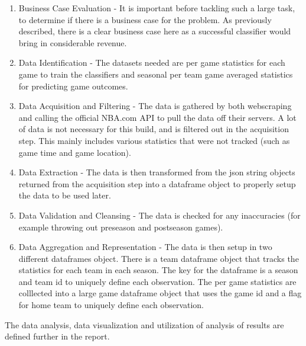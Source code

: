 \documentclass[12pt]{article}%
\begin{document}
\begin{enumerate}
\item Business Case Evaluation - It is important before tackling such a large task, to determine if there is a business case for the problem. As previously described, there is a clear business case here as a successful classifier would bring in considerable revenue.
\item Data Identification - The datasets needed are per game statistics for each game to train the classifiers and seasonal per team game averaged statistics for predicting game outcomes.
\item Data Acquisition and Filtering - The data is gathered by both webscraping and calling the official NBA.com API to pull the data off their servers. A lot of data is not necessary for this build, and is filtered out in the acquisition step. This mainly includes various statistics that were not tracked (such as game time and game location).
\item Data Extraction - The data is then transformed from the json string objects returned from the acquisition step into a dataframe object to properly setup the data to be used later.
\item Data Validation and Cleansing - The data is checked for any inaccuracies (for example throwing out preseason and postseason games).
\item Data Aggregation and Representation - The data is then setup in two different dataframes object. There is a team dataframe object that tracks the statistics for each team in each season. The key for the dataframe is a season and team id to uniquely define each observation. The per game statistics are colllected into a large game dataframe object that uses the game id and a flag for home team to uniquely define each observation.

\end{enumerate}

The data analysis, data visualization and utilization of analysis of results are defined further in the report.
\end{document}
